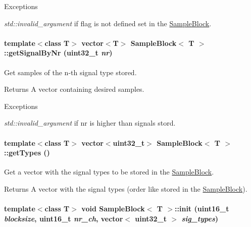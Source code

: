 \begin{DoxyExceptions}{Exceptions}
\item[{\em std::invalid\_\-argument}]if flag is not defined set in the \hyperlink{class_sample_block}{SampleBlock}. \end{DoxyExceptions}
\hypertarget{class_sample_block_a1a6a7cf636807d2c3595031ca4d5cbed}{
\paragraph[{getSignalByNr}]{\setlength{\rightskip}{0pt plus 5cm}template$<$class T$>$ vector$<$T$>$ {\bf SampleBlock}$<$ T $>$::getSignalByNr (uint32\_\-t {\em nr})}\hfill}
\label{class_sample_block_a1a6a7cf636807d2c3595031ca4d5cbed}


Get samples of the n-\/th signal type stored. \begin{DoxyReturn}{Returns}
A vector containing desired samples. 
\end{DoxyReturn}

\begin{DoxyExceptions}{Exceptions}
\item[{\em std::invalid\_\-argument}]if nr is higher than signals stord. \end{DoxyExceptions}
\hypertarget{class_sample_block_a88392883021407912963d869b7327c64}{
\paragraph[{getTypes}]{\setlength{\rightskip}{0pt plus 5cm}template$<$class T$>$ vector$<$uint32\_\-t$>$ {\bf SampleBlock}$<$ T $>$::getTypes ()}\hfill}
\label{class_sample_block_a88392883021407912963d869b7327c64}


Get a vector with the signal types to be stored in the \hyperlink{class_sample_block}{SampleBlock}. \begin{DoxyReturn}{Returns}
A vector with the signal types (order like stored in the \hyperlink{class_sample_block}{SampleBlock}). 
\end{DoxyReturn}
\hypertarget{class_sample_block_aaa6f432732f41a4442aa5c686a47d1ff}{
\paragraph[{init}]{\setlength{\rightskip}{0pt plus 5cm}template$<$class T$>$ void {\bf SampleBlock}$<$ T $>$::init (uint16\_\-t {\em blocksize}, \/  uint16\_\-t {\em nr\_\-ch}, \/  vector$<$ uint32\_\-t $>$ {\em sig\_\-types})}\hfill}
\label{class_sample_block_aaa6f432732f41a4442aa5c686a47d1ff}


